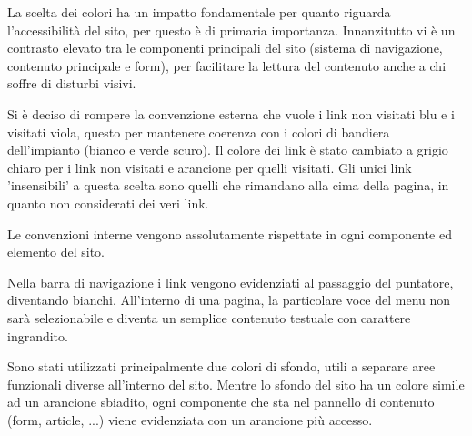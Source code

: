 La scelta dei colori ha un impatto fondamentale per quanto riguarda l'accessibilità del sito, per questo è di primaria importanza. Innanzitutto vi è un contrasto elevato tra le componenti principali del sito (sistema di navigazione, contenuto principale e form), per facilitare la lettura del contenuto anche a chi soffre di disturbi visivi.

Si è deciso di rompere la convenzione esterna che vuole i link non visitati blu e i visitati viola, questo per mantenere coerenza con i colori di bandiera dell'impianto (bianco e verde scuro). Il colore dei link è stato cambiato a grigio chiaro per i link non visitati e arancione per quelli visitati. Gli unici link 'insensibili' a questa scelta sono quelli che rimandano alla cima della pagina, in quanto non considerati dei veri link.

Le convenzioni interne vengono assolutamente rispettate in ogni componente ed elemento del sito.

Nella barra di navigazione i link vengono evidenziati al passaggio del puntatore, diventando bianchi. All'interno di una pagina, la particolare voce del menu non sarà selezionabile e diventa un semplice contenuto testuale con carattere ingrandito.

Sono stati utilizzati principalmente due colori di sfondo, utili a separare aree funzionali diverse all'interno del sito. Mentre lo sfondo del sito ha un colore simile ad un arancione sbiadito, ogni componente che sta nel pannello di contenuto (form, article, ...) viene evidenziata con un arancione più accesso.